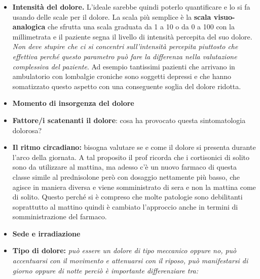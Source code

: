 \documentclass[]{article}
\begin{document}
\begin{itemize}
\item
  \textbf{Intensità del dolore.} L'ideale sarebbe quindi poterlo
  quantificare e lo si fa usando delle scale per il dolore. La scala più
  semplice è la \textbf{scala visuo-analogica} che sfrutta una scala
  graduata da 1 a 10 o da 0 a 100 con la millimetrata e il paziente
  segna il livello di intensità percepita del suo dolore. \emph{Non deve
  stupire che ci si concentri sull'intensità percepita piuttosto che
  effettiva perché questo parametro può fare la differenza nella
  valutazione complessiva del paziente}. Ad esempio tantissimi pazienti
  che arrivano in ambulatorio con lombalgie croniche sono soggetti
  depressi e che hanno somatizzato questo aspetto con una conseguente
  soglia del dolore ridotta.
\item
  \textbf{Momento di insorgenza del dolore}
\item
  \textbf{Fattore/i scatenanti il dolore}: cosa ha provocato questa
  sintomatologia dolorosa?
\item
  \textbf{Il ritmo circadiano:} bisogna valutare se e come il dolore si
  presenta durante l'arco della giornata. A tal proposito il prof
  ricorda che i cortisonici di solito sono da utilizzare al mattina, ma
  adesso c'è un nuovo farmaco di questa classe simile al prednisolone
  però con dosaggio nettamente più basso, che agisce in maniera diversa
  e viene somministrato di sera e non la mattina come di solito. Questo
  perché si è compreso che molte patologie sono debilitanti soprattutto
  al mattino quindi è cambiato l'approccio anche in termini di
  somministrazione del farmaco.
\item
  \textbf{Sede e irradiazione}
\item
  \textbf{Tipo di dolore:} \emph{può essere un dolore di tipo meccanico
  oppure no, può accentuarsi con il movimento e attenuarsi con il
  riposo, può manifestarsi di giorno oppure di notte perciò è importante
  differenziare tra:}
\end{itemize}
\end{document}
